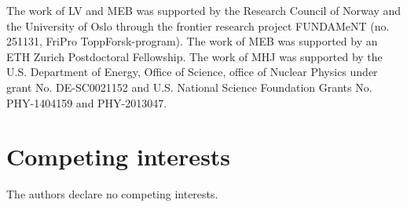 \documentclass[superscriptaddress,unsortedaddress,
 amsmath,amssymb,
 aps,
]{revtex4-2}
\begin{document}


\begin{acknowledgments}

The work of LV and MEB was supported by the Research Council of Norway and the University of Oslo through the frontier research project FUNDAMeNT (no. 251131, FriPro ToppForsk-program). 
The work of MEB was supported by an ETH Zurich Postdoctoral Fellowship. 
The work of MHJ was supported by the U.S. Department of Energy,
Office of Science, office of Nuclear Physics under grant
No. DE-SC0021152 and U.S. National Science Foundation Grants
No. PHY-1404159 and PHY-2013047. 


\end{acknowledgments}


\section*{Competing interests}
The authors declare no competing interests.
\end{document}
